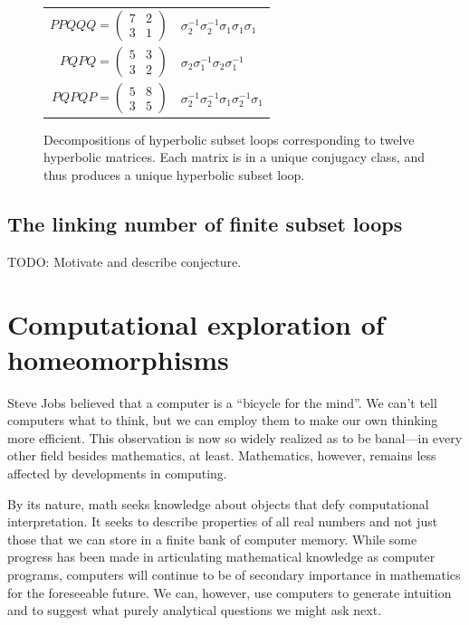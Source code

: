 \documentclass[12pt,twoside]{reedthesis}
\theoremstyle{definition}
\newcommand{\TODO}[1]{{\color{todopink}\textsf{TODO: #1}}}
\begin{document}
\begin{figure}[p]
\begin{tabular}{r l}
   $PPQQQ = \begin{pmatrix}7 & 2 \\ 3 & 1\end{pmatrix}$ & $\sigma_2^{-1} \sigma_2^{-1} \sigma_1 \sigma_1 \sigma_1$ \\[1em]
   $PQPQ = \begin{pmatrix}5 & 3 \\ 3 & 2\end{pmatrix}$ & $\sigma_2 \sigma_1^{-1} \sigma_2 \sigma_1^{-1}$ \\[1em]
   $PQPQP = \begin{pmatrix}5 & 8 \\ 3 & 5\end{pmatrix}$ & $\sigma_2^{-1} \sigma_2^{-1} \sigma_1 \sigma_2^{-1} \sigma_1$
  \end{tabular}
  \caption{Decompositions of hyperbolic subset loops corresponding to twelve hyperbolic matrices. Each matrix is in a unique conjugacy class, and thus produces a unique hyperbolic subset loop.}
  \label{fig:subset_loop_decompositions_table}
\end{figure}


\section{The linking number of finite subset loops}

\TODO{Motivate and describe conjecture.}

\newpage
\appendix

\chapter{Computational exploration of homeomorphisms}


Steve Jobs believed that a computer is a ``bicycle for the mind''\cite{krainin1990}.
We can't tell computers what to think, but we can employ them to make our own thinking more efficient.
This observation is now so widely realized as to be banal---in every other field besides mathematics, at least.
Mathematics, however, remains less affected by developments in computing.

By its nature, math seeks knowledge about objects that defy computational interpretation.
It seeks to describe properties of all real numbers and not just those that we can store in a finite bank of computer memory.
While some progress has been made in articulating mathematical knowledge as computer programs, computers will continue to be of secondary importance in mathematics for the foreseeable future.
We can, however, use computers to generate intuition and to suggest what purely analytical questions we might ask next.
\end{document}
